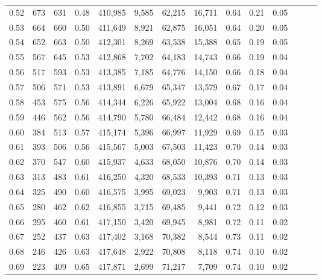 \begin{tabular}{rrrrrrrrrrrrrr}
0.52 &     673 &    631 &  0.48 &  410,985 &    9,585 &  62,215 &  16,711 &  0.64 &  0.21 &      0.05 \\
0.53 &     664 &    660 &  0.50 &  411,649 &    8,921 &  62,875 &  16,051 &  0.64 &  0.20 &      0.05 \\
0.54 &     652 &    663 &  0.50 &  412,301 &    8,269 &  63,538 &  15,388 &  0.65 &  0.19 &      0.05 \\
0.55 &     567 &    645 &  0.53 &  412,868 &    7,702 &  64,183 &  14,743 &  0.66 &  0.19 &      0.04 \\
0.56 &     517 &    593 &  0.53 &  413,385 &    7,185 &  64,776 &  14,150 &  0.66 &  0.18 &      0.04 \\
0.57 &     506 &    571 &  0.53 &  413,891 &    6,679 &  65,347 &  13,579 &  0.67 &  0.17 &      0.04 \\
0.58 &     453 &    575 &  0.56 &  414,344 &    6,226 &  65,922 &  13,004 &  0.68 &  0.16 &      0.04 \\
0.59 &     446 &    562 &  0.56 &  414,790 &    5,780 &  66,484 &  12,442 &  0.68 &  0.16 &      0.04 \\
0.60 &     384 &    513 &  0.57 &  415,174 &    5,396 &  66,997 &  11,929 &  0.69 &  0.15 &      0.03 \\
0.61 &     393 &    506 &  0.56 &  415,567 &    5,003 &  67,503 &  11,423 &  0.70 &  0.14 &      0.03 \\
0.62 &     370 &    547 &  0.60 &  415,937 &    4,633 &  68,050 &  10,876 &  0.70 &  0.14 &      0.03 \\
0.63 &     313 &    483 &  0.61 &  416,250 &    4,320 &  68,533 &  10,393 &  0.71 &  0.13 &      0.03 \\
0.64 &     325 &    490 &  0.60 &  416,575 &    3,995 &  69,023 &   9,903 &  0.71 &  0.13 &      0.03 \\
0.65 &     280 &    462 &  0.62 &  416,855 &    3,715 &  69,485 &   9,441 &  0.72 &  0.12 &      0.03 \\
0.66 &     295 &    460 &  0.61 &  417,150 &    3,420 &  69,945 &   8,981 &  0.72 &  0.11 &      0.02 \\
0.67 &     252 &    437 &  0.63 &  417,402 &    3,168 &  70,382 &   8,544 &  0.73 &  0.11 &      0.02 \\
0.68 &     246 &    426 &  0.63 &  417,648 &    2,922 &  70,808 &   8,118 &  0.74 &  0.10 &      0.02 \\
0.69 &     223 &    409 &  0.65 &  417,871 &    2,699 &  71,217 &   7,709 &  0.74 &  0.10 &      0.02 \\

\end{tabular}
